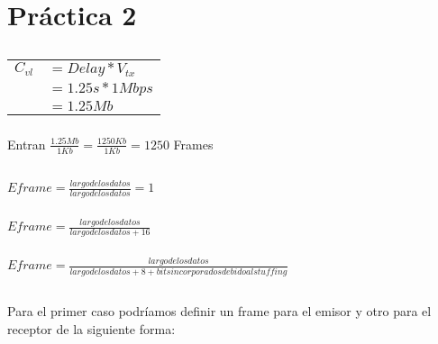 \section{Práctica 2}

\subsection{}

\subsubsection{}
\begin{tabular}{rl}
$C_{vl}$ & $= Delay * V_{tx}$ \\
& $= 1.25s * 1Mbps$ \\
& $= 1.25Mb$ \\
\end{tabular}

\subsubsection{}
Entran $\frac{1.25Mb}{1Kb} = \frac{1250Kb}{1Kb} = 1250$ Frames

\subsection{}

\subsubsection{}
$Eframe = \frac{largo de los datos}{largo de los datos} = 1$

\subsubsection{}
$Eframe = \frac{largo de los datos}{largo de los datos + 16}$

\subsubsection{}
$Eframe = \frac{largo de los datos}{largo de los datos + 8 + bits incorporados debido al stuffing}$

\subsection{}

\subsubsection{}
Para el primer caso podríamos definir un frame para el emisor y otro para el receptor de la siguiente forma:

